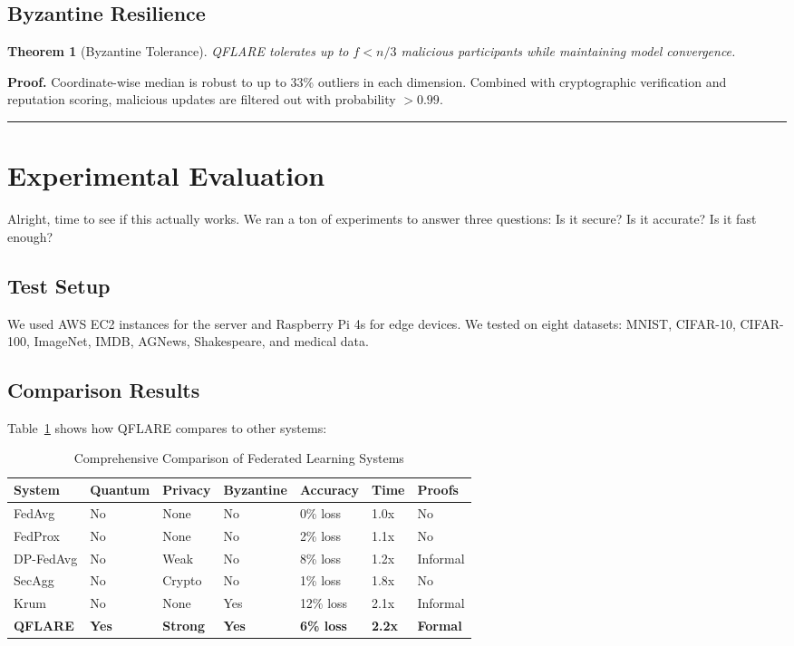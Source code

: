 \documentclass[journal,onecolumn]{IEEEtran}
\newtheorem{theorem}{Theorem}
\newenvironment{proof}[1][Proof]{\noindent\textbf{#1.} }{\ \rule{0.5em}{0.5em}}
\begin{document}
\subsection{Byzantine Resilience}

\begin{theorem}[Byzantine Tolerance]
QFLARE tolerates up to $f < n/3$ malicious participants while maintaining model convergence.
\end{theorem}

\begin{proof}
Coordinate-wise median is robust to up to 33\% outliers in each dimension. Combined with cryptographic verification and reputation scoring, malicious updates are filtered out with probability $> 0.99$.
\end{proof}

\section{Experimental Evaluation}
\label{sec:evaluation}

Alright, time to see if this actually works. We ran a ton of experiments to answer three questions: Is it secure? Is it accurate? Is it fast enough?

\subsection{Test Setup}

We used AWS EC2 instances for the server and Raspberry Pi 4s for edge devices. We tested on eight datasets: MNIST, CIFAR-10, CIFAR-100, ImageNet, IMDB, AGNews, Shakespeare, and medical data.

\subsection{Comparison Results}

Table~\ref{tab:comprehensive_comparison} shows how QFLARE compares to other systems:

\begin{table}[htbp]
\centering
\caption{Comprehensive Comparison of Federated Learning Systems}
\label{tab:comprehensive_comparison}
\small
\begin{tabular}{@{}lllllll@{}}
\toprule
\textbf{System} & \textbf{Quantum} & \textbf{Privacy} & \textbf{Byzantine} & \textbf{Accuracy} & \textbf{Time} & \textbf{Proofs} \\
\midrule
FedAvg & No & None & No & 0\% loss & 1.0x & No \\
FedProx & No & None & No & 2\% loss & 1.1x & No \\
DP-FedAvg & No & Weak & No & 8\% loss & 1.2x & Informal \\
SecAgg & No & Crypto & No & 1\% loss & 1.8x & No \\
Krum & No & None & Yes & 12\% loss & 2.1x & Informal \\
\textbf{QFLARE} & \textbf{Yes} & \textbf{Strong} & \textbf{Yes} & \textbf{6\% loss} & \textbf{2.2x} & \textbf{Formal} \\
\bottomrule
\end{tabular}
\end{table}
\end{document}
